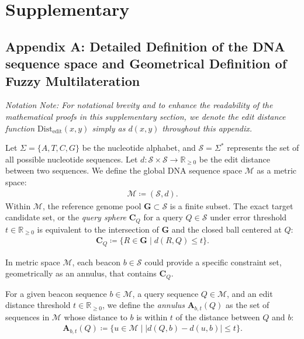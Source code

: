 \documentclass[10pt,runningheads]{llncs}
\begin{document}
\section*{Supplementary}

\subsection*{Appendix A: Detailed Definition of the DNA sequence space and Geometrical Definition of Fuzzy Multilateration}

\textit{Notation Note: For notational brevity and to enhance the readability of the mathematical proofs in this supplementary section, we denote the edit distance function $\mathrm{Dist}_{\mathrm{edit}}(x, y)$ simply as $d(x, y)$ throughout this appendix.}
\begin{definition}
Let $\Sigma = \{A, T, C, G\}$ be the nucleotide alphabet, and $\mathcal{S} = \Sigma^*$ represents the set of all possible nucleotide sequences. Let $d: \mathcal{S} \times \mathcal{S} \to \mathbb{R}_{\geq0}$ be the edit distance between two sequences. We define the global DNA sequence space $\mathcal{M}$ as a metric space:
\begin{align}
    \mathcal{M} \coloneqq (\mathcal{S}, d).
\end{align}
Within $\mathcal{M}$, the reference genome pool $\textbf{G} \subset \mathcal{S}$ is a finite subset. The exact target candidate set, or the \textit{query sphere }$\textbf{C}_Q$ for a query $Q \in \mathcal{S}$ under error threshold $t \in \mathbb{R}_{\geq0}$ is equivalent to the intersection of $\textbf{G}$ and the closed ball centered at $Q$:
\begin{align}
    \textbf{C}_Q \coloneqq \{ R \in \textbf{G} \mid d(R, Q) \leq t \}.
\end{align}
\end{definition}

In metric space $\mathcal{M}$, each beacon $b \in \mathcal{S}$ could provide a specific constraint set, geometrically as an annulus, that contains $\textbf{C}_Q$.

\begin{definition}
    For a given beacon sequence $b \in \mathcal{M}$, a query sequence $Q \in  \mathcal{M}$, and an edit distance threshold $t \in \mathbb{R}_{\geq0}$, we define the \textit{annulus} $\textbf{A}_{b, t}(Q)$ as the set of sequences in $\mathcal{M}$ whose distance to $b$ is within $t$ of the distance between $Q$ and $b$:
    \begin{align}
       \textbf{A}_{b, t}(Q) \coloneqq \{ u \in \mathcal{M} \mid |d(Q, b) - d(u, b)| \leq t \}.
    \end{align}
    \label{def:annulus}
\end{definition}
\end{document}
